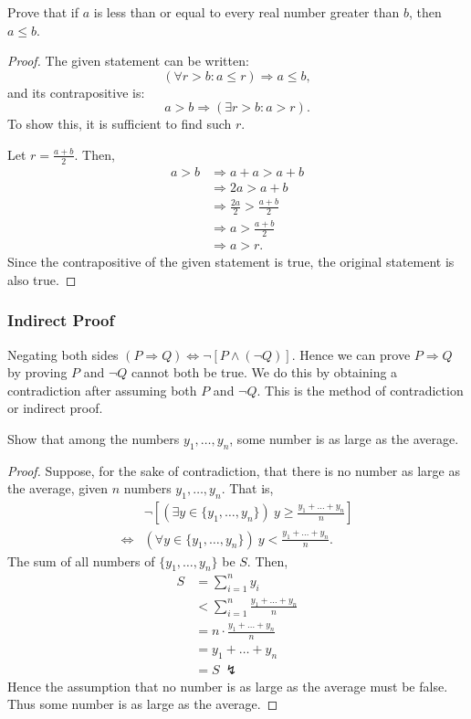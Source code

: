 \documentclass[../main.tex]{subfiles}
\begin{document}
\begin{ex}
    Prove that if $a$ is less than or equal to every real number greater than $b$, then $a \leq b$.
\end{ex}
\begin{proof}
    The given statement can be written:
    \[
        (\forall r > b: a \leq r) \Rightarrow a \leq b,
    \]
    and its contrapositive is:
    \[
        a > b \Rightarrow (\exists r > b: a > r).
    \]
    To show this, it is sufficient to find such $r$.

    Let $r = \frac{a+b}{2}$.
    Then,
    \begin{align*}
        a > b &\Rightarrow a + a > a + b\\
              &\Rightarrow 2a > a + b\\
              &\Rightarrow \frac{2a}{2} > \frac{a+b}{2}\\
              &\Rightarrow a > \frac{a+b}{2}\\
              &\Rightarrow a > r.
    \end{align*}
    Since the contrapositive of the given statement is true, the original statement is also true.
\end{proof}

\subsubsection{Indirect Proof}
Negating both sides $(P \Rightarrow Q) \Leftrightarrow \neg [P \wedge (\neg Q)]$.
Hence we can prove $P \Rightarrow Q$ by proving $P$ and $\neg Q$ cannot both be true.
We do this by obtaining a contradiction after assuming both $P$ and $\neg Q$.
This is the \textsf{method of contradiction} or \textsf{indirect proof}.

\begin{ex}
    Show that among the numbers $y_1, \dots, y_n$, some number is as large as the average.
\end{ex}
\begin{proof}
    Suppose, for the sake of contradiction, that there is no number as large as the average, given $n$ numbers $y_1, \dots, y_n$.
    That is,
    \begin{align*}
        & \neg \left[(\exists y \in \{y_1, \dots, y_n\})\ y \geq \frac{y_1 + \dots + y_n}{n} \right]\\
        \Leftrightarrow & (\forall y \in \{y_1, \dots, y_n\})\ y < \frac{y_1 + \dots + y_n}{n}.
    \end{align*}
    The sum of all numbers of $\{y_1, \dots, y_n\}$ be $S$.
    Then,
    \begin{align*}
        S &= \sum_{i=1}^{n} y_i\\
          &< \sum_{i=1}^{n} \frac{y_1 + \dots + y_n}{n}\\
          &= n \cdot \frac{y_1 + \dots + y_n}{n}\\
          &= y_1 + \dots + y_n\\
          &= S\ \lightning
    \end{align*}
    Hence the assumption that no number is as large as the average must be false.
    Thus some number is as large as the average.
\end{proof}
\end{document}
